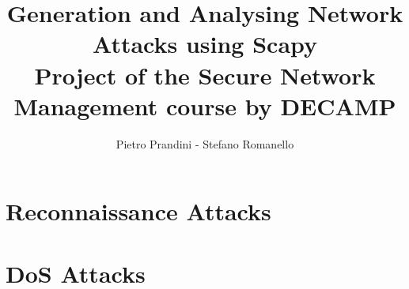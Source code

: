 \documentclass[10pt,a4paper]{article}
\author{Pietro Prandini - Stefano Romanello}
\title{Generation and Analysing Network Attacks using Scapy\\{\small{Project of the Secure Network Management course by DECAMP}}}
\begin{document}
\maketitle %

\section{Reconnaissance Attacks}



\section{DoS Attacks}
\end{document}
